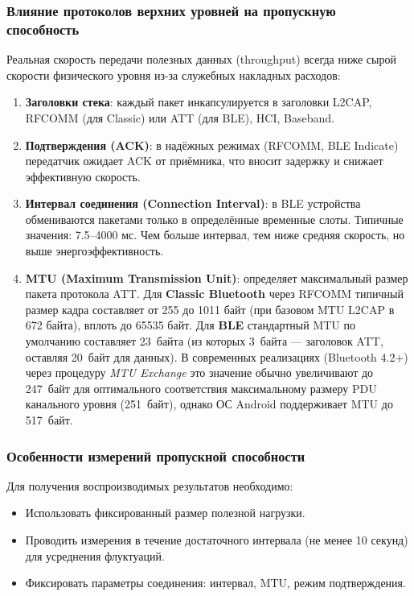 \subsubsection{Влияние протоколов верхних уровней на пропускную способность}
Реальная скорость передачи полезных данных (throughput) всегда ниже сырой скорости физического уровня из-за служебных накладных расходов:

\begin{enumerate}[nosep]
    \item \textbf{Заголовки стека}: каждый пакет инкапсулируется в заголовки L2CAP, RFCOMM (для Classic) или ATT (для BLE), HCI, Baseband.
    \item \textbf{Подтверждения (ACK)}: в надёжных режимах (RFCOMM, BLE Indicate) передатчик ожидает ACK от приёмника, что вносит задержку и снижает эффективную скорость.
    \item \textbf{Интервал соединения (Connection Interval)}: в BLE устройства обмениваются пакетами только в определённые временные слоты. Типичные значения: 7.5--4000 мс. Чем больше интервал, тем ниже средняя скорость, но выше энергоэффективность.
    \item \textbf{MTU (Maximum Transmission Unit)}: определяет максимальный размер пакета протокола ATT. 
Для \textbf{Classic Bluetooth} через RFCOMM типичный размер кадра составляет от 255 до 1011 байт (при базовом MTU L2CAP в 672 байта), вплоть до 65535 байт.
Для \textbf{BLE} стандартный MTU по умолчанию составляет 23~байта (из которых 3~байта — заголовок ATT, оставляя 20~байт для данных). 
В современных реализациях (Bluetooth 4.2+) через процедуру \textit{MTU Exchange} это значение обычно увеличивают до 247~байт для оптимального соответствия максимальному размеру PDU канального уровня (251~байт), однако ОС Android поддерживает MTU до 517~байт.

\end{enumerate}

\subsubsection{Особенности измерений пропускной способности}
Для получения воспроизводимых результатов необходимо:
\begin{itemize}[nosep]
    \item Использовать фиксированный размер полезной нагрузки.
    \item Проводить измерения в течение достаточного интервала (не менее 10 секунд) для усреднения флуктуаций.
    \item Фиксировать параметры соединения: интервал, MTU, режим подтверждения.
\end{itemize}

